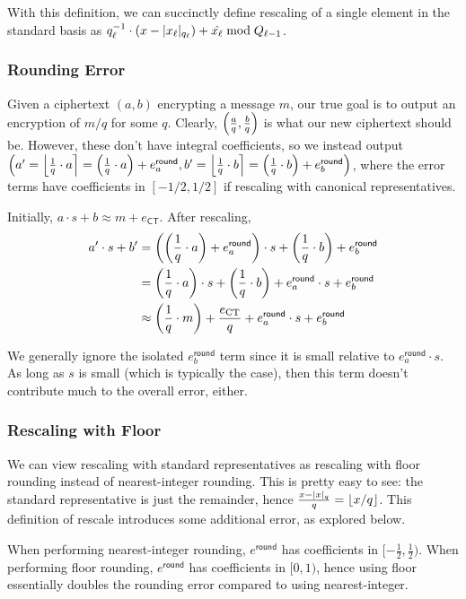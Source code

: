 \documentclass[../../fheimpl.tex]{subfiles}
\begin{document}
With this definition, we can succinctly define rescaling of a single element in the standard basis as $q_\ell^{-1}\cdot(x-\abs{x_\ell}_{q_\ell})+\hat{x_\ell} \bmod Q_{\ell-1}$.

\subsubsection{Rounding Error}
\label{sec:rescale_error}
Given a ciphertext $(a,b)$ encrypting a message $m$, our true goal is to output an encryption of $m/q$ for some $q$. Clearly, $\parens*{\frac{a}{q}, \frac{b}{q}}$ is what our new ciphertext should be. However, these don't have integral coefficients, so we instead output $\parens*{a'=\round*{\frac{1}{q}\cdot a}=\parens*{\frac{1}{q}\cdot a}+e^\mathsf{round}_a, b'=\round*{\frac{1}{q}\cdot b}=\parens*{\frac{1}{q}\cdot b}+e^\mathsf{round}_b}$, where the error terms have coefficients in $[-1/2, 1/2]$ if rescaling with canonical representatives.

Initially, $a\cdot s+b\approx m+e_\mathsf{CT}$. After rescaling, 
\begin{align}
	a'\cdot s+b' &=\parens*{\parens*{\frac{1}{q}\cdot a}+e^\mathsf{round}_a}\cdot s + \parens*{\frac{1}{q}\cdot b}+e^\mathsf{round}_b \\
	&= \parens*{\frac{1}{q}\cdot a}\cdot s + \parens*{\frac{1}{q}\cdot b} + e^\mathsf{round}_a\cdot s +e^\mathsf{round}_b \\
	&\approx  \parens*{\frac{1}{q}\cdot m} + \frac{e_\mathrm{CT}}{q} + e^\mathsf{round}_a\cdot s +e^\mathsf{round}_b
\end{align}

We generally ignore the isolated $e^\mathsf{round}_b$ term since it is small relative to $e^\mathsf{round}_a\cdot s$. As long as $s$ is small (which is typically the case), then this term doesn't contribute much to the overall error, either.

\subsubsection{Rescaling with Floor}
\label{sec:roundingerr}
We can view rescaling with standard representatives as rescaling with floor rounding instead of nearest-integer rounding. This is pretty easy to see: the standard representative is just the remainder, hence $\frac{x-\abs{x}_q}{q} = \floor{x/q}$. This definition of rescale introduces some additional error, as explored below.

When performing nearest-integer rounding, $e^\mathsf{round}$ has coefficients in $[-\frac{1}{2}, \frac{1}{2})$. When performing floor rounding, $e^\mathsf{round}$ has coefficients in $[0, 1)$, hence using floor essentially doubles the rounding error compared to using nearest-integer.
\end{document}
